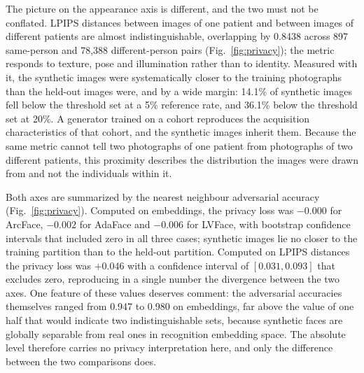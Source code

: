 The picture on the appearance axis is different, and the two must not be
conflated. LPIPS distances between images of one patient and between images of
different patients are almost indistinguishable, overlapping by 0.8438 across
897 same-person and 78,388 different-person pairs
(Fig.~\ref{fig:privacy}); the metric responds to
texture, pose and illumination rather than to identity. Measured with it, the
synthetic images were systematically closer to the training photographs than the
held-out images were, and by a wide margin: 14.1\% of synthetic images fell
below the threshold set at a 5\% reference rate, and 36.1\% below the threshold
set at 20\%. %
A generator trained on a cohort reproduces the acquisition characteristics of
that cohort, and the synthetic images inherit them. Because the same metric
cannot tell two photographs of one patient from photographs of two different
patients, this proximity describes the distribution the images were drawn from
and not the individuals within it.

Both axes are summarized by the nearest neighbour adversarial accuracy
(Fig.~\ref{fig:privacy}). Computed on embeddings, the
privacy loss was $-0.000$ for ArcFace, $-0.002$ for AdaFace and $-0.006$ for
LVFace, with bootstrap confidence intervals that included zero in all three
cases; %
synthetic images lie no closer to the training partition than to the held-out
partition. Computed on LPIPS distances the privacy loss was $+0.046$ with a
confidence interval of $[0.031, 0.093]$ that excludes zero, %
reproducing in a single number the divergence between the two axes. One feature
of these values deserves comment: the adversarial accuracies themselves ranged
from 0.947 to 0.980 on embeddings, %
far above the value of one half that would indicate two indistinguishable sets,
because synthetic faces are globally separable from real ones in recognition
embedding space. The absolute level therefore carries no privacy
interpretation here, and only the difference between the two comparisons does.

